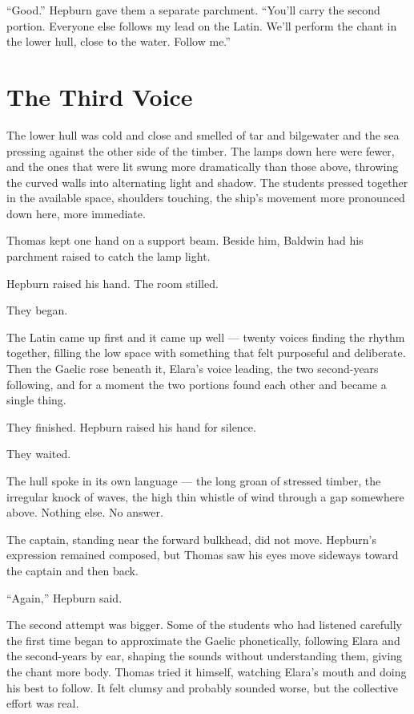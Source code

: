 \enquote{Good.} Hepburn gave them a separate parchment. \enquote{You'll carry the second portion. Everyone else follows my lead on the Latin. We'll perform the chant in the lower hull, close to the water. Follow me.}

\section*{The Third Voice}

The lower hull was cold and close and smelled of tar and bilgewater and the sea pressing against the other side of the timber. The lamps down here were fewer, and the ones that were lit swung more dramatically than those above, throwing the curved walls into alternating light and shadow. The students pressed together in the available space, shoulders touching, the ship's movement more pronounced down here, more immediate.

Thomas kept one hand on a support beam. Beside him, Baldwin had his parchment raised to catch the lamp light.

Hepburn raised his hand. The room stilled.

They began.

The Latin came up first and it came up well --- twenty voices finding the rhythm together, filling the low space with something that felt purposeful and deliberate. Then the Gaelic rose beneath it, Elara's voice leading, the two second-years following, and for a moment the two portions found each other and became a single thing.

They finished. Hepburn raised his hand for silence.

They waited.

The hull spoke in its own language --- the long groan of stressed timber, the irregular knock of waves, the high thin whistle of wind through a gap somewhere above. Nothing else. No answer.

The captain, standing near the forward bulkhead, did not move. Hepburn's expression remained composed, but Thomas saw his eyes move sideways toward the captain and then back.

\enquote{Again,} Hepburn said.

The second attempt was bigger. Some of the students who had listened carefully the first time began to approximate the Gaelic phonetically, following Elara and the second-years by ear, shaping the sounds without understanding them, giving the chant more body. Thomas tried it himself, watching Elara's mouth and doing his best to follow. It felt clumsy and probably sounded worse, but the collective effort was real.

